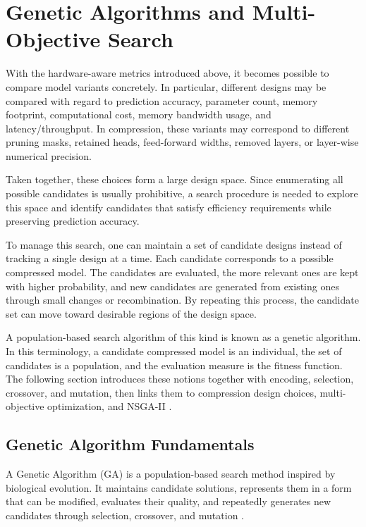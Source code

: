 \section{Genetic Algorithms and Multi-Objective Search}
\label{sec:multiobjective_genetic_algorithms}

With the hardware-aware metrics introduced above, it becomes possible to compare model variants concretely. In particular, different designs may be compared with regard to prediction accuracy, parameter count, memory footprint, computational cost, memory bandwidth usage, and latency/throughput. In compression, these variants may correspond to different pruning masks, retained heads, feed-forward widths, removed layers, or layer-wise numerical precision.

Taken together, these choices form a large design space. Since enumerating all possible candidates is usually prohibitive, a search procedure is needed to explore this space and identify candidates that satisfy efficiency requirements while preserving prediction accuracy.

To manage this search, one can maintain a set of candidate designs instead of tracking a single design at a time. Each candidate corresponds to a possible compressed model. The candidates are evaluated, the more relevant ones are kept with higher probability, and new candidates are generated from existing ones through small changes or recombination. By repeating this process, the candidate set can move toward desirable regions of the design space.

A population-based search algorithm of this kind is known as a genetic algorithm. In this terminology, a candidate compressed model is an individual, the set of candidates is a population, and the evaluation measure is the fitness function. The following section introduces these notions together with encoding, selection, crossover, and mutation, then links them to compression design choices, multi-objective optimization, and NSGA-II \cite{holland1975adaptation,goldberg1989genetic,deb2001multi}.

\subsection{Genetic Algorithm Fundamentals}

A Genetic Algorithm (GA) is a population-based search method inspired by biological evolution. It maintains candidate solutions, represents them in a form that can be modified, evaluates their quality, and repeatedly generates new candidates through selection, crossover, and mutation \cite{holland1975adaptation,goldberg1989genetic,michalewicz1996genetic}.

